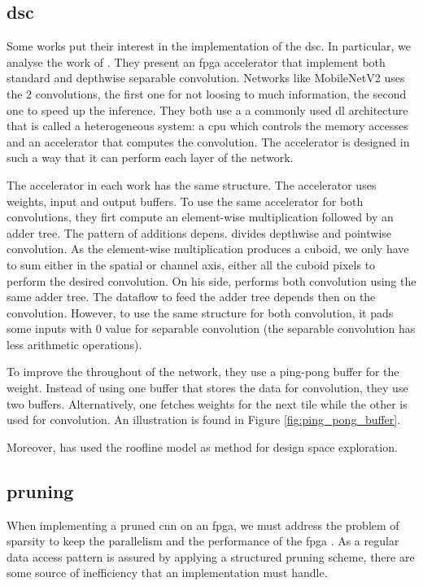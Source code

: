 \subsection{dsc}
%
%
Some works put their interest in the implementation of the \acrshort{dsc}. In particular, we analyse the work of \textcite{bai_cnn_2018, liu_fpga-based_2019}. They present an \acrshort{fpga} accelerator that implement both standard and depthwise separable convolution. Networks like MobileNetV2 uses the 2 convolutions, the first one for not loosing to much information, the second one to speed up the inference. They both use a a commonly used \acrshort{dl} architecture that is called a heterogeneous system: a \acrshort{cpu} which controls the memory accesses and an accelerator that computes the convolution. The accelerator is designed in such a way that it can perform each layer of the network.

The accelerator in each work has the same structure. The accelerator uses weights, input and output buffers. To use the same accelerator for both convolutions, they firt compute an element-wise multiplication followed by an adder tree. The pattern of additions depens. \textcite{bai_cnn_2018} divides depthwise and pointwise convolution. As the element-wise multiplication produces a cuboid, we only have to sum either in the spatial or channel axis, either all the cuboid pixels to perform the desired convolution. On his side, \textcite{liu_fpga-based_2019} performs both convolution using the same adder tree. The dataflow to feed the adder tree depends then on the convolution. However, to use the same structure for both convolution, it pads some inputs with 0 value for separable convolution (the separable convolution has less arithmetic operations).

To improve the throughout of the network, they use a \acrshort{ping-pong} buffer for the weight. Instead of using one buffer that stores the data for convolution, they use two buffers. Alternatively, one fetches weights for the next tile while the other is used for convolution. An illustration is found in Figure \ref{fig:ping_pong_buffer}.

Moreover, \textcite{liu_fpga-based_2019} has used the roofline model as method for design space exploration.
%
%
\subsection{pruning}
%
%
When implementing a pruned \acrshort{cnn} on an \acrshort{fpga}, we must address the problem of sparsity to keep the parallelism and the performance of the \acrshort{fpga} \cite{zhu_efficient_2020}. As a regular data access pattern is assured by applying a structured pruning scheme, there are some source of inefficiency that an implementation must handle.

